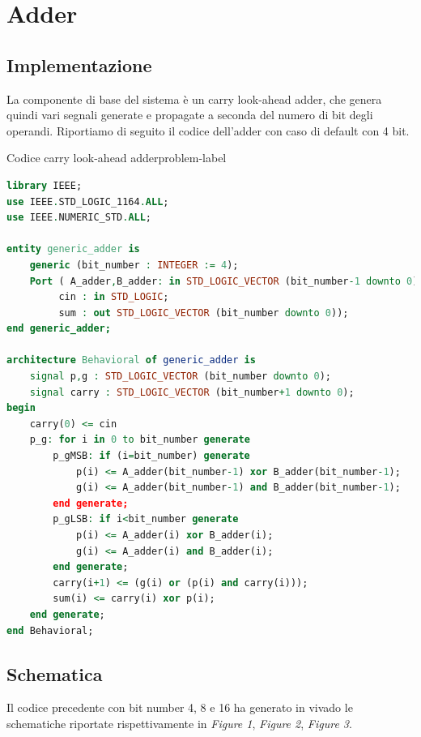 \section{Adder}
\subsection{Implementazione}
La componente di base del sistema è un carry look-ahead adder, che genera quindi vari segnali generate e propagate a seconda del numero di bit degli operandi.
Riportiamo di seguito il codice dell'adder con caso di default con 4 bit.

\begin{problem}{Codice carry look-ahead adder}{problem-label}
\begin{lstlisting}[language=VHDL]
library IEEE;
use IEEE.STD_LOGIC_1164.ALL;
use IEEE.NUMERIC_STD.ALL;

entity generic_adder is
    generic (bit_number : INTEGER := 4);
    Port ( A_adder,B_adder: in STD_LOGIC_VECTOR (bit_number-1 downto 0);
         cin : in STD_LOGIC;
         sum : out STD_LOGIC_VECTOR (bit_number downto 0));
end generic_adder;

architecture Behavioral of generic_adder is
    signal p,g : STD_LOGIC_VECTOR (bit_number downto 0);
    signal carry : STD_LOGIC_VECTOR (bit_number+1 downto 0);
begin
    carry(0) <= cin
    p_g: for i in 0 to bit_number generate
        p_gMSB: if (i=bit_number) generate
            p(i) <= A_adder(bit_number-1) xor B_adder(bit_number-1);
            g(i) <= A_adder(bit_number-1) and B_adder(bit_number-1);
        end generate;
        p_gLSB: if i<bit_number generate
            p(i) <= A_adder(i) xor B_adder(i);
            g(i) <= A_adder(i) and B_adder(i);
        end generate;
        carry(i+1) <= (g(i) or (p(i) and carry(i)));
        sum(i) <= carry(i) xor p(i);
    end generate;
end Behavioral;

\end{lstlisting}
\end{problem}

\subsection{Schematica}
Il codice precedente con bit number 4, 8 e 16 ha generato in vivado le schematiche riportate rispettivamente in \textit{Figure 1}, \textit{Figure 2}, \textit{Figure 3}.

